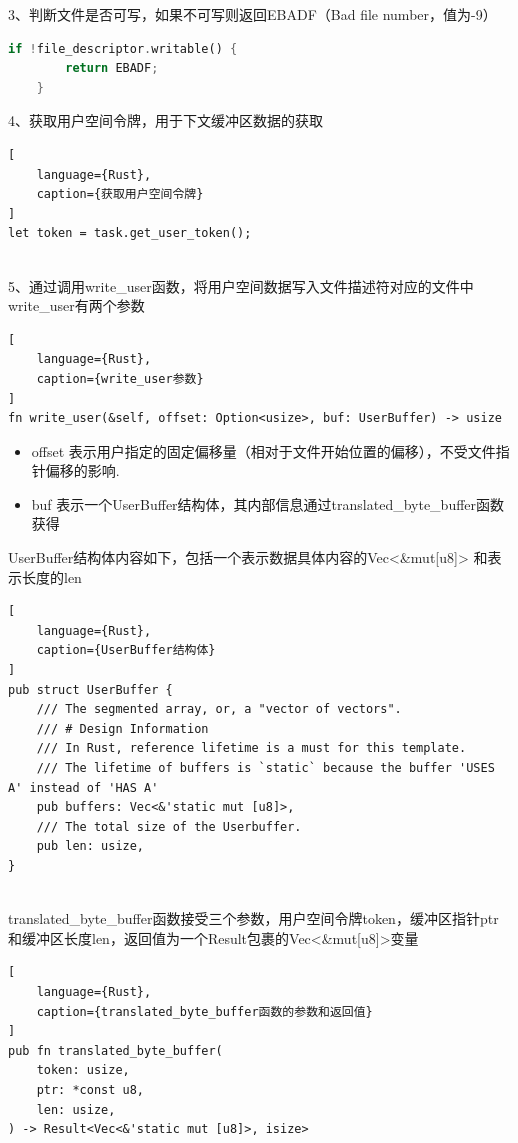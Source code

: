 3、判断文件是否可写，如果不可写则返回EBADF（Bad file number，值为-9）
\begin{lstlisting}[language={Rust},
    caption={文件权限判断}]
    if !file_descriptor.writable() {
        return EBADF;
    }
\end{lstlisting}

4、获取用户空间令牌，用于下文缓冲区数据的获取

\begin{lstlisting}[
    language={Rust},
    caption={获取用户空间令牌}
]
let token = task.get_user_token();
    
\end{lstlisting}

5、通过调用write_user函数，将用户空间数据写入文件描述符对应的文件中
write_user有两个参数
\begin{lstlisting}[
    language={Rust},
    caption={write_user参数}
]
fn write_user(&self, offset: Option<usize>, buf: UserBuffer) -> usize
\end{lstlisting}
\begin{itemize}
    \item offset 表示用户指定的固定偏移量（相对于文件开始位置的偏移），不受文件指针偏移的影响.
    \item buf 表示一个UserBuffer结构体，其内部信息通过translated_byte_buffer函数获得
\end{itemize}
    UserBuffer结构体内容如下，包括一个表示数据具体内容的Vec<\&mut[u8]> 和表示长度的len
\begin{lstlisting}[
    language={Rust},
    caption={UserBuffer结构体}
]
pub struct UserBuffer {
    /// The segmented array, or, a "vector of vectors".
    /// # Design Information
    /// In Rust, reference lifetime is a must for this template.
    /// The lifetime of buffers is `static` because the buffer 'USES A' instead of 'HAS A'
    pub buffers: Vec<&'static mut [u8]>,
    /// The total size of the Userbuffer.
    pub len: usize,
}
    
\end{lstlisting}

translated_byte_buffer函数接受三个参数，用户空间令牌token，缓冲区指针ptr和缓冲区长度len，返回值为一个Result包裹的Vec<\&mut[u8]>变量

\begin{lstlisting}[
    language={Rust},
    caption={translated_byte_buffer函数的参数和返回值}
]
pub fn translated_byte_buffer(
    token: usize,
    ptr: *const u8,
    len: usize,
) -> Result<Vec<&'static mut [u8]>, isize> 
    
\end{lstlisting}

